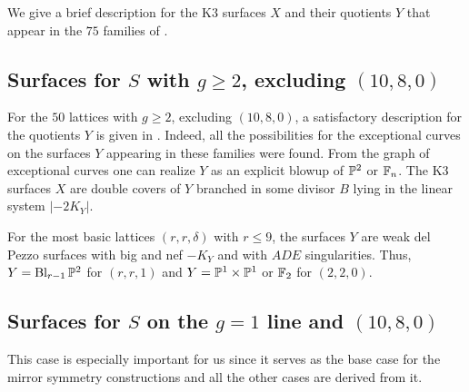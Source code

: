 \documentclass{amsart}
\begin{document}
We give a brief description for the K3 surfaces $X$ and their
quotients $Y$ that appear in the $75$ families of \fign.

\subsection{Surfaces for $S$ with $g\ge2$, excluding
  $(10,8,0)$}
\label{sec:surfaces-g>1}

For the $50$ lattices with $g\ge2$, excluding $(10,8,0)$, a
satisfactory description for the quotients $Y$ is given in
\cite{alexeev2006del-pezzo}. Indeed, all the possibilities for the
exceptional curves on the surfaces $Y$ appearing in these
families were found. From the graph of exceptional curves one can
realize $Y$ as an explicit blowup of ${\mathbb P}^2$ or ${\mathbb F}_n$. 
The K3 surfaces $X$ are double covers of $Y$ branched in some divisor
$B$ lying in the linear system $|-2K_Y|$.

For the most basic lattices $(r,r,\delta)$ with $r\le 9$, the surfaces
$Y$ are weak del Pezzo surfaces with big and nef $-K_Y$ and with $ADE$
singularities. Thus, $Y=\operatorname{Bl}_{r-1}{\mathbb P}^2$ for $(r,r,1)$ and
$Y={\mathbb P}^1\times{\mathbb P}^1$ or ${\mathbb F}_2$ for $(2,2,0)$. 


\subsection{Surfaces for $S$ on the $g=1$ line and $(10,8,0)$}
\label{sec:k3-elliptic-pencil}

This case is especially important for us since it serves as the base
case for the mirror symmetry constructions and all the other cases are
derived from it.
\end{document}
